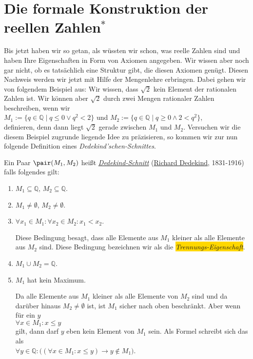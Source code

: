 \section{Die formale Konstruktion der reellen Zahlen$^*$}
Bis jetzt haben wir so getan, als w\"ussten wir schon, was reelle Zahlen sind und haben Ihre
Eigenschaften in Form von Axiomen angegeben.  Wir wissen  aber noch gar nicht, ob es tats\"achlich
eine Struktur gibt, die diesen Axiomen gen\"ugt.  Diesen Nachweis werden wir jetzt mit Hilfe der
Mengenlehre erbringen.  Dabei gehen wir von folgendem Beispiel aus:  Wir wissen, dass $\sqrt{2}$
kein Element der rationalen Zahlen ist.  Wir k\"onnen aber $\sqrt{2}$ durch zwei Mengen rationaler
Zahlen beschreiben, wenn wir
\\[0.2cm]
\hspace*{1.3cm}
$M_1 := \{ q \in \mathbb{Q} \mid q \leq 0 \vee q^2 < 2 \}$ \quad und \quad 
$M_2 := \{ q \in \mathbb{Q} \mid q \geq 0 \wedge 2 < q^2 \}$,
\\[0.2cm]
definieren, denn dann liegt $\sqrt{2}$ gerade zwischen $M_1$ und $M_2$.  
Versuchen wir die diesem Beispiel zugrunde liegende Idee zu pr\"azisieren, so kommen wir zur nun
folgende Definition eines \emph{Dedekind'schen-Schnittes}.

\begin{Definition} \lb
Ein Paar $\pair(M_1,M_2)$ hei\ss{}t \href{http://de.wikipedia.org/wiki/Dedekindscher_Schnitt}{\emph{Dedekind-Schnitt}}
(\href{http://de.wikipedia.org/wiki/Richard_Dedekind}{\textrm{Richard Dedekind}}, 1831-1916)
falls folgendes gilt:
\begin{enumerate}
\item $M_1 \subseteq  \mathbb{Q}$, \quad $M_2 \subseteq \mathbb{Q}$.
\item $M_1 \not= \emptyset$, \quad $M_2 \not= \emptyset$.
\item $\forall x_1 \in M_1: \forall x_2 \in M_2: x_1 < x_2$.

       Diese Bedingung besagt, dass alle Elemente aus $M_1$ kleiner als alle Elemente aus $M_2$
       sind.  Diese Bedingung bezeichnen wir als die \colorbox{gold}{\emph{Trennungs-Eigenschaft}}.
\item $M_1 \cup M_2 = \mathbb{Q}$.
\item $M_1$ hat kein Maximum.

      Da alle Elemente aus $M_1$ kleiner als alle Elemente von $M_2$ sind und da dar\"uber hinaus 
      $M_2 \not= \emptyset$ ist, ist $M_1$ sicher nach oben beschr\"ankt.  Aber wenn f\"ur ein $y$
      \\[0.2cm]
      \hspace*{1.3cm}
      $\forall x \in M_1: x \leq y$
      \\[0.2cm]
      gilt, dann darf $y$ eben kein Element von $M_1$ sein.  Als Formel schreibt sich das als
      \\[0.2cm]
      \hspace*{1.3cm}
      $\forall y \in \mathbb{Q}: \bigl((\forall x \in M_1: x \leq y) \rightarrow y \not\in M_1\bigr)$. \edx
\end{enumerate}
\end{Definition}

